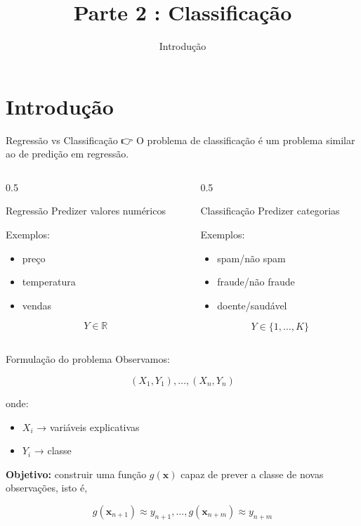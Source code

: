 \documentclass[
  ignorenonframetext,
  aspectratio=169,
]{beamer}
\title{Parte 2 : Classificação}
\subtitle{{Introdução}}
\author{}
\date{}
\providecommand{\tightlist}{%
  \setlength{\itemsep}{0pt}\setlength{\parskip}{0pt}}
\begin{document}
\frame{\titlepage}


\section{Introdução}\label{introduuxe7uxe3o}

\begin{frame}{Regressão vs Classificação}
\label{regressuxe3o-vs-classificauxe7uxe3o}
{👉} O problema de classificação é um problema similar ao de predição em
regressão.

\begin{columns}[T]
\begin{column}{0.5\linewidth}
\begin{block}{Regressão}
\label{regressuxe3o}
Predizer valores numéricos

Exemplos:

\begin{itemize}
\tightlist
\item
  preço
\item
  temperatura
\item
  vendas
\end{itemize}

\[
Y \in \mathbb{R}
\]
\end{block}
\end{column}

\begin{column}{0.5\linewidth}
\begin{block}{Classificação}
\label{classificauxe7uxe3o}
Predizer categorias

Exemplos:

\begin{itemize}
\tightlist
\item
  spam/não spam
\item
  fraude/não fraude
\item
  doente/saudável
\end{itemize}

\[
Y \in \{1,\dots,K\}
\]
\end{block}
\end{column}
\end{columns}
\end{frame}

\begin{frame}{Formulação do problema}
\label{formulauxe7uxe3o-do-problema}
Observamos:

\[
(X_1,Y_1),\dots,(X_n,Y_n)
\]

onde:

\begin{itemize}
\tightlist
\item
  \(X_i\) → variáveis explicativas
\item
  \(Y_i\) → classe
\end{itemize}

\textbf{Objetivo:} construir uma função \(g(\mathbf{x})\) capaz de
prever a classe de novas observações, isto é,

\[
g(\mathbf{x}_{n+1}) \approx y_{n+1}, \ldots, g(\mathbf{x}_{n+m}) \approx y_{n+m}
\]
\end{frame}
\end{document}
